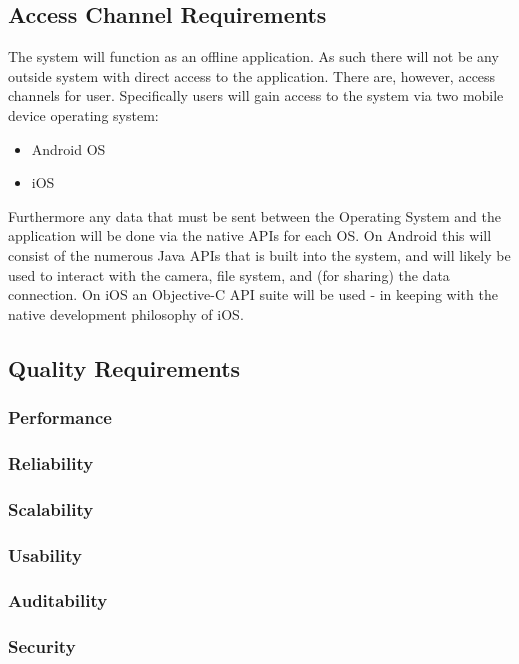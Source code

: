 \documentclass[a4paper,12pt]{article}
\begin{document}
\subsection{Access Channel Requirements}
The system will function as an offline application. As such there will not be any outside system with direct access to the application. There are, however, access channels for user. Specifically users will gain access to the system via two mobile device operating system:
\begin{itemize}
	\item Android OS
	\item iOS
\end{itemize}

Furthermore any data that must be sent between the Operating System and the application will be done via the native APIs for each OS. On Android this will consist of the numerous Java APIs that is built into the system, and will likely be used to interact with the camera, file system, and (for sharing) the data connection. On iOS an Objective-C API suite will be used - in keeping with the native development philosophy of iOS.
\subsection{Quality Requirements}

\subsubsection{Performance}

\subsubsection{Reliability}

\subsubsection{Scalability}

\subsubsection{Usability} 

\subsubsection{Auditability}

\subsubsection{Security}
\end{document}
